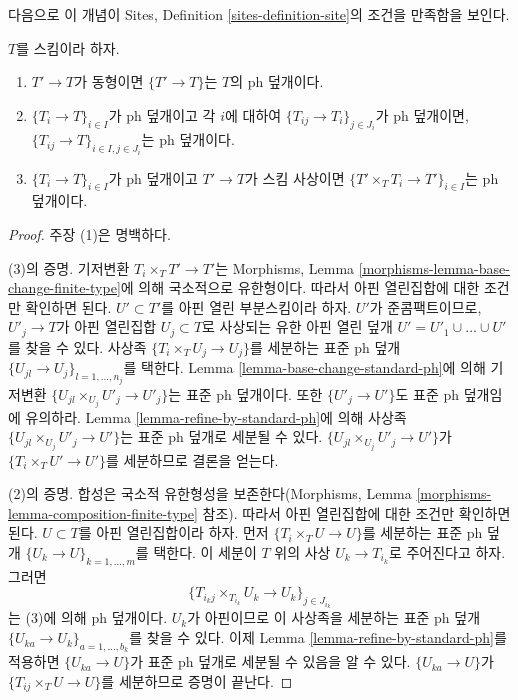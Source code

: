 \noindent
다음으로 이 개념이 Sites, Definition \ref{sites-definition-site}의
조건을 만족함을 보인다.

\begin{lemma}
\label{lemma-ph}
$T$를 스킴이라 하자.
\begin{enumerate}
\item $T' \to T$가 동형이면 $\{T' \to T\}$는 $T$의 ph 덮개이다.
\item $\{T_i \to T\}_{i\in I}$가 ph 덮개이고 각 $i$에 대하여
$\{T_{ij} \to T_i\}_{j\in J_i}$가 ph 덮개이면,
$\{T_{ij} \to T\}_{i \in I, j\in J_i}$는 ph 덮개이다.
\item $\{T_i \to T\}_{i\in I}$가 ph 덮개이고 $T' \to T$가 스킴
사상이면 $\{T' \times_T T_i \to T'\}_{i\in I}$는 ph 덮개이다.
\end{enumerate}
\end{lemma}

\begin{proof}
주장 (1)은 명백하다.

\medskip\noindent
(3)의 증명. 기저변환 $T_i \times_T T' \to T'$는 Morphisms, Lemma
\ref{morphisms-lemma-base-change-finite-type}에 의해 국소적으로 유한형이다.
따라서 아핀 열린집합에 대한 조건만 확인하면 된다. $U' \subset T'$를
아핀 열린 부분스킴이라 하자. $U'$가 준콤팩트이므로, $U'_j \to T$가
아핀 열린집합 $U_j \subset T$로 사상되는 유한 아핀 열린 덮개
$U' = U'_1 \cup \ldots \cup U'$를 찾을 수 있다. 사상족
$\{T_i \times_T U_j \to U_j\}$를 세분하는 표준 ph 덮개
$\{U_{jl} \to U_j\}_{l = 1, \ldots, n_j}$를 택한다. Lemma
\ref{lemma-base-change-standard-ph}에 의해 기저변환
$\{U_{jl} \times_{U_j} U'_j \to U'_j\}$는 표준 ph 덮개이다. 또한
$\{U'_j \to U'\}$도 표준 ph 덮개임에 유의하라. Lemma
\ref{lemma-refine-by-standard-ph}에 의해 사상족
$\{U_{jl} \times_{U_j} U'_j \to U'\}$는 표준 ph 덮개로 세분될 수 있다.
$\{U_{jl} \times_{U_j} U'_j \to U'\}$가
$\{T_i \times_T U' \to U'\}$를 세분하므로 결론을 얻는다.

\medskip\noindent
(2)의 증명. 합성은 국소적 유한형성을 보존한다(Morphisms, Lemma
\ref{morphisms-lemma-composition-finite-type} 참조). 따라서 아핀
열린집합에 대한 조건만 확인하면 된다. $U \subset T$를 아핀
열린집합이라 하자. 먼저 $\{T_i \times_T U \to U\}$를 세분하는 표준 ph
덮개 $\{U_k \to U\}_{k = 1, \ldots, m}$를 택한다. 이 세분이 $T$ 위의
사상 $U_k \to T_{i_k}$로 주어진다고 하자. 그러면
$$
\{T_{i_kj} \times_{T_{i_k}} U_k \to U_k\}_{j \in J_{i_k}}
$$
는 (3)에 의해 ph 덮개이다. $U_k$가 아핀이므로 이 사상족을 세분하는
표준 ph 덮개 $\{U_{ka} \to U_k\}_{a = 1, \ldots, b_k}$를 찾을 수 있다.
이제 Lemma \ref{lemma-refine-by-standard-ph}를 적용하면
$\{U_{ka} \to U\}$가 표준 ph 덮개로 세분될 수 있음을 알 수 있다.
$\{U_{ka} \to U\}$가 $\{T_{ij} \times_T U \to U\}$를 세분하므로 증명이
끝난다.
\end{proof}

